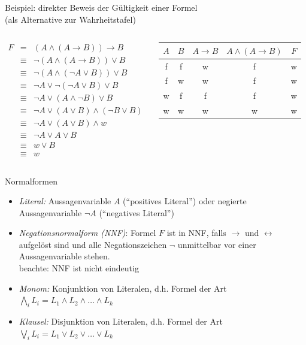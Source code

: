 \begin{frame}{Beispiel: direkter Beweis der Gültigkeit einer Formel\\ \hspace{1.6cm} (als Alternative zur Wahrheitstafel)}
	\begin{columns}
		\begin{eqnarray*}
				F &=& (A \land (A \rightarrow B)) \rightarrow B\\
				  &\equiv& \neg (A \land (A \rightarrow B)) \lor B\\
				  &\equiv& \neg (A \land (\neg A \lor B)) \lor B\\
				  &\equiv& \neg A \lor \neg(\neg A \lor B) \lor B\\
				  &\equiv& \neg A \lor (A \land \neg B) \lor B\\
				  &\equiv& \neg A \lor (A \lor B) \land (\neg B \lor B)\\
				  &\equiv& \neg A \lor (A \lor B) \land w\\
				  &\equiv& \neg A \lor A \lor B\\
				  &\equiv& w \lor B\\
				  &\equiv& w
		\end{eqnarray*}
			\begin{tabular}{|c|c|c|c||c|}
				\hline
				$A$ & $B$ & $A \rightarrow B$ & $A \land (A \rightarrow B)$ & $F$ \\
				\hline
				f & f & w & f & w \\
				f & w & w & f & w \\
				w & f & f & f & w \\
				w & w & w & w & w \\
				\hline
			\end{tabular}
	\end{columns}		
\end{frame}

\begin{frame}{Normalformen}
	\begin{itemize}
		\item \emph{Literal:} Aussagenvariable $A$ ("`positives Literal"') oder negierte Aussagenvariable $\neg A$ ("`negatives Literal"')
		\item \emph{Negationsnormalform (NNF)}: Formel $F$ ist in NNF, falls $\rightarrow$ und $\leftrightarrow$ aufgelöst sind und alle Negationszeichen $\neg$ unmittelbar vor einer Aussagenvariable stehen.\\
		beachte: NNF ist nicht eindeutig
		\item \emph{Monom:} Konjunktion von Literalen, d.h. Formel der Art\\
		$\bigwedge_iL_i=L_1\land L_2\land\ldots\land L_k$
		\item \emph{Klausel:} Disjunktion von Literalen, d.h. Formel der Art\\
		$\bigvee_iL_i=L_1\lor L_2\lor\ldots\lor L_k$
	\end{itemize}
\end{frame}


